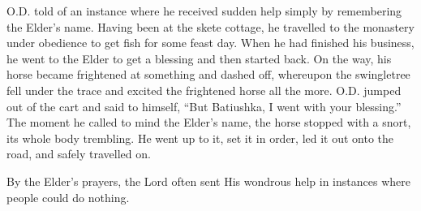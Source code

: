 O.D. told of an instance where he received sudden help simply by remembering the Elder's name. Having been at the skete cottage, he travelled to the monastery under obedience to get fish for some feast day. When he had finished his business, he went to the Elder to get a blessing and then started back. On the way, his horse became frightened at something and dashed off, whereupon the swingletree fell under the trace and excited the frightened horse all the more. O.D. jumped out of the cart and said to himself, ``But Batiushka, I went with your blessing.'' The moment he called to mind the Elder's name, the horse stopped with a snort, its whole body trembling. He went up to it, set it in order, led it out onto the road, and safely travelled on.

By the Elder's prayers, the Lord often sent His wondrous help in instances where people could do nothing. 
